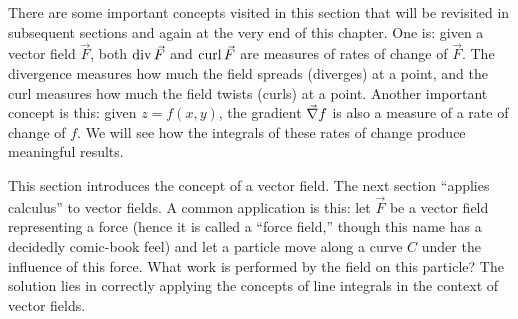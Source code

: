 There are some important concepts visited in this section that will be revisited in subsequent sections and again at the very end of this chapter. One is: given a vector field $\vec F$, both $\operatorname{div}\vec F$ and $\operatorname{curl}\vec F$ are measures of rates of change of $\vec F$. The divergence measures how much the field spreads (diverges) at a point, and the curl measures how much the field twists (curls) at a point. Another important concept is this: given $z=f(x,y)$, the gradient $\vec\nabla f$ is also a measure of a rate of change of $f$. We will see how the integrals of these rates of change produce meaningful results.

This section introduces the concept of a vector field. The next section ``applies calculus'' to vector fields. A common application is this: let $\vec F$ be a vector field representing a force (hence it is called a ``force field,'' though this name has a decidedly comic-book feel) and let a particle move along a curve $C$ under the influence of this force. What work is performed by the field on this particle? The solution lies in correctly applying the concepts of line integrals in the context of vector fields.



